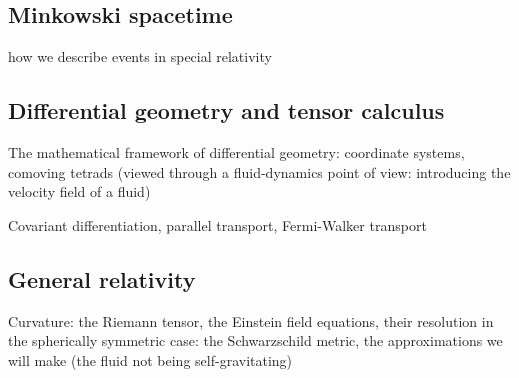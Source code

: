 \documentclass[main.tex]{subfiles}
\begin{document}
\subsection{Minkowski spacetime}

how we describe events in special relativity

\subsection{Differential geometry and tensor calculus}

The mathematical framework of differential geometry: coordinate systems, comoving tetrads (viewed through a fluid-dynamics point of view: introducing the velocity field of a fluid)

Covariant differentiation, parallel transport, Fermi-Walker transport

\subsection{General relativity}

Curvature: the Riemann tensor, the Einstein field equations, their resolution in the spherically symmetric case: the Schwarzschild metric, the approximations we will make (the fluid not being self-gravitating)
\end{document}
